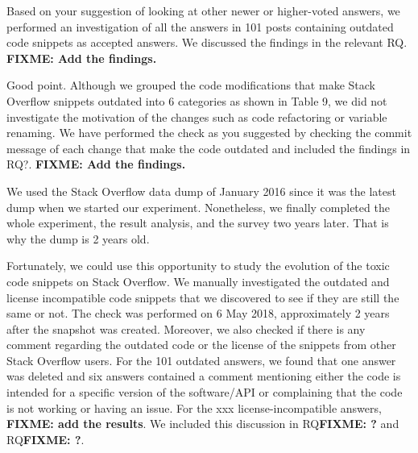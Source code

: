 \documentclass[a4paper,twoside,10pt]{reviewresponse}
\newcommand\FIXME[1]{{\color{red}\textbf{FIXME: #1}}}
\begin{document}
Based on your suggestion of looking at other newer or higher-voted answers, we performed an investigation of all the answers in 101 posts containing outdated code snippets as accepted answers. We discussed the findings in the relevant RQ. \FIXME{Add the findings.}
		
		

Good point. Although we grouped the code modifications that make Stack Overflow snippets outdated into 6 categories as shown in Table 9, we did not investigate the motivation of the changes such as code refactoring or variable renaming. We have performed the check as you suggested by checking the commit message of each change that make the code outdated and included the findings in RQ?. \FIXME{Add the findings.}


We used the Stack Overflow data dump of January 2016 since it was the latest dump when we started our experiment. Nonetheless, we finally completed the whole experiment, the result analysis, and the survey two years later. That is why the dump is 2 years old.

Fortunately, we could use this opportunity to study the evolution of the toxic code snippets on Stack Overflow. We manually investigated the outdated and license incompatible code snippets that we discovered to see if they are still the same or not. The check was performed on 6 May 2018, approximately 2 years after the snapshot was created. Moreover, we also checked if there is any comment regarding the outdated code or the license of the snippets from other Stack Overflow users. For the 101 outdated answers, we found that one answer was deleted and six answers contained a comment mentioning either the code is intended for a specific version of the software/API or complaining that the code is not working or having an issue. 
For the xxx license-incompatible answers, \FIXME{add the results}.
We included this discussion in RQ\FIXME{?} and RQ\FIXME{?}.

\end{document}
